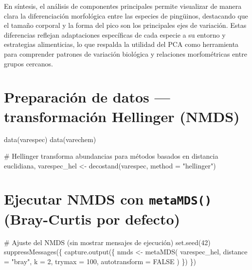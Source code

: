 \documentclass[
  spanish,
  11pt,
  a4paper,
  DIV=11,
  numbers=noendperiod]{scrartcl}
\newenvironment{Shaded}{\begin{snugshade}}{\end{snugshade}}
\newcommand{\AttributeTok}[1]{\textcolor[rgb]{0.40,0.45,0.13}{#1}}
\newcommand{\CommentTok}[1]{\textcolor[rgb]{0.37,0.37,0.37}{#1}}
\newcommand{\ConstantTok}[1]{\textcolor[rgb]{0.56,0.35,0.01}{#1}}
\newcommand{\DecValTok}[1]{\textcolor[rgb]{0.68,0.00,0.00}{#1}}
\newcommand{\FunctionTok}[1]{\textcolor[rgb]{0.28,0.35,0.67}{#1}}
\newcommand{\NormalTok}[1]{\textcolor[rgb]{0.00,0.23,0.31}{#1}}
\newcommand{\OtherTok}[1]{\textcolor[rgb]{0.00,0.23,0.31}{#1}}
\newcommand{\StringTok}[1]{\textcolor[rgb]{0.13,0.47,0.30}{#1}}
\begin{document}
En síntesis, el análisis de componentes principales permite visualizar
de manera clara la diferenciación morfológica entre las especies de
pingüinos, destacando que el tamaño corporal y la forma del pico son los
principales ejes de variación. Estas diferencias reflejan adaptaciones
específicas de cada especie a su entorno y estrategias alimenticias, lo
que respalda la utilidad del PCA como herramienta para comprender
patrones de variación biológica y relaciones morfométricas entre grupos
cercanos.

\section{Preparación de datos --- transformación Hellinger
(NMDS)}\label{preparaciuxf3n-de-datos-transformaciuxf3n-hellinger-nmds}

\begin{Shaded}
\begin{Highlighting}[numbers=left,,]
\FunctionTok{data}\NormalTok{(varespec)}
\FunctionTok{data}\NormalTok{(varechem)}

\CommentTok{\# Hellinger transforma abundancias para métodos basados en distancia euclidiana,}
\NormalTok{varespec\_hel }\OtherTok{\textless{}{-}} \FunctionTok{decostand}\NormalTok{(varespec, }\AttributeTok{method =} \StringTok{"hellinger"}\NormalTok{)}
\end{Highlighting}
\end{Shaded}

\section{\texorpdfstring{Ejecutar NMDS con \texttt{metaMDS()}
(Bray-Curtis por
defecto)}{Ejecutar NMDS con metaMDS() (Bray-Curtis por defecto)}}\label{ejecutar-nmds-con-metamds-bray-curtis-por-defecto}

\begin{Shaded}
\begin{Highlighting}[numbers=left,,]
\CommentTok{\# Ajuste del NMDS (sin mostrar mensajes de ejecución)}
\FunctionTok{set.seed}\NormalTok{(}\DecValTok{42}\NormalTok{)}
\FunctionTok{suppressMessages}\NormalTok{(\{}
  \FunctionTok{capture.output}\NormalTok{(\{}
\NormalTok{    nmds }\OtherTok{\textless{}{-}} \FunctionTok{metaMDS}\NormalTok{(}
\NormalTok{      varespec\_hel,}
      \AttributeTok{distance =} \StringTok{"bray"}\NormalTok{,}
      \AttributeTok{k =} \DecValTok{2}\NormalTok{,}
      \AttributeTok{trymax =} \DecValTok{100}\NormalTok{,}
      \AttributeTok{autotransform =} \ConstantTok{FALSE}
\NormalTok{    )}
\NormalTok{  \})}
\NormalTok{\})}
\end{Highlighting}
\end{Shaded}
\end{document}
